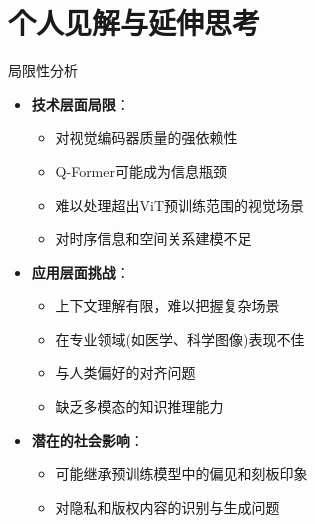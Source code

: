 \documentclass{beamer}
\begin{document}
  \section{个人见解与延伸思考}

 \begin{frame}{局限性分析}
  \begin{itemize}
    \item \textbf{技术层面局限}：
      \begin{itemize}
        \item 对视觉编码器质量的强依赖性
        \item Q-Former可能成为信息瓶颈
        \item 难以处理超出ViT预训练范围的视觉场景
        \item 对时序信息和空间关系建模不足
      \end{itemize}
    \item \textbf{应用层面挑战}：
      \begin{itemize}
        \item 上下文理解有限，难以把握复杂场景
        \item 在专业领域(如医学、科学图像)表现不佳
        \item 与人类偏好的对齐问题
        \item 缺乏多模态的知识推理能力
      \end{itemize}
    \item \textbf{潜在的社会影响}：
      \begin{itemize}
        \item 可能继承预训练模型中的偏见和刻板印象
        \item 对隐私和版权内容的识别与生成问题
      \end{itemize}
  \end{itemize}
\end{frame}
\end{document}
